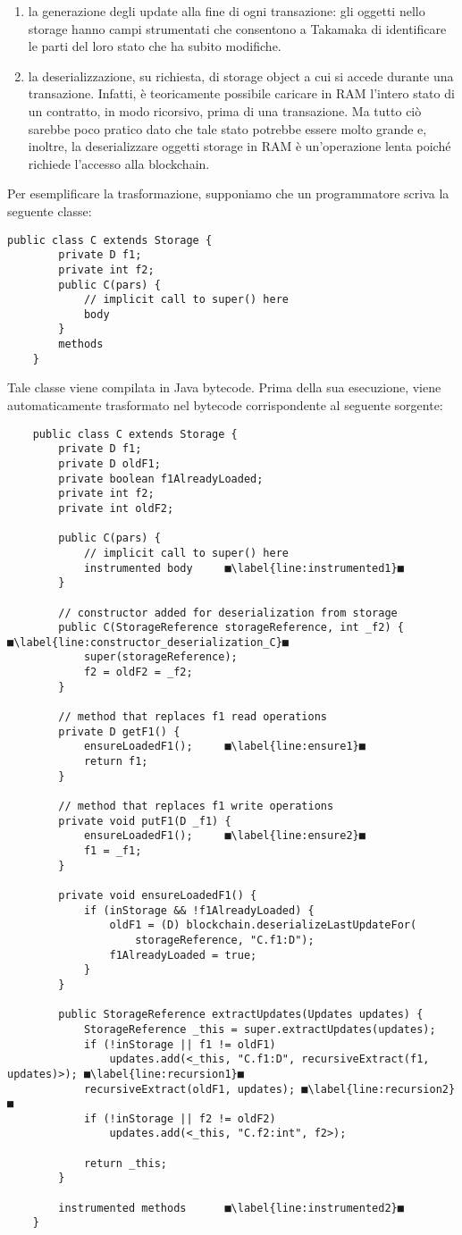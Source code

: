 \begin{enumerate}
	\item la generazione degli update alla fine di ogni transazione: gli oggetti nello storage hanno campi strumentati che consentono a Takamaka di identificare le parti del loro stato che ha subito modifiche.
	\item la deserializzazione, su richiesta, di storage object a cui si accede durante una transazione. Infatti, è teoricamente possibile caricare in RAM l'intero stato di un contratto, in modo ricorsivo, prima di una transazione. Ma tutto ciò sarebbe poco pratico dato che tale stato potrebbe essere molto grande e, inoltre, la deserializzare oggetti storage in RAM è un'operazione lenta poiché richiede l'accesso alla blockchain.
\end{enumerate}
Per esemplificare la trasformazione, supponiamo che un programmatore scriva la seguente classe:
%
\begin{lstlisting}[numbers=none,frame=none]
	public class C extends Storage {
		private D f1;
		private int f2;
		public C(pars) {
			// implicit call to super() here
			body
		}
		methods
	}
\end{lstlisting}
%
Tale classe viene compilata in Java bytecode. Prima della sua esecuzione, viene automaticamente trasformato nel bytecode corrispondente al seguente sorgente:
%
\begin{lstlisting}
	public class C extends Storage {
		private D f1;
		private D oldF1;
		private boolean f1AlreadyLoaded;
		private int f2;
		private int oldF2;
	
		public C(pars) {
			// implicit call to super() here
			instrumented body     ■\label{line:instrumented1}■
		}
	
		// constructor added for deserialization from storage
		public C(StorageReference storageReference, int _f2) { ■\label{line:constructor_deserialization_C}■
			super(storageReference);
			f2 = oldF2 = _f2;
		}
		
		// method that replaces f1 read operations
		private D getF1() {
			ensureLoadedF1();     ■\label{line:ensure1}■
			return f1;
		}
		
		// method that replaces f1 write operations
		private void putF1(D _f1) {
			ensureLoadedF1();     ■\label{line:ensure2}■
			f1 = _f1;
		}
		
		private void ensureLoadedF1() {
			if (inStorage && !f1AlreadyLoaded) {
				oldF1 = (D) blockchain.deserializeLastUpdateFor(
					storageReference, "C.f1:D");
				f1AlreadyLoaded = true;
			}
		}
		
		public StorageReference extractUpdates(Updates updates) {
			StorageReference _this = super.extractUpdates(updates);
			if (!inStorage || f1 != oldF1)
				updates.add(<_this, "C.f1:D", recursiveExtract(f1, updates)>); ■\label{line:recursion1}■
			recursiveExtract(oldF1, updates); ■\label{line:recursion2}■
			if (!inStorage || f2 != oldF2)
				updates.add(<_this, "C.f2:int", f2>);
		
			return _this;
		}
		
		instrumented methods      ■\label{line:instrumented2}■
	}
\end{lstlisting}
